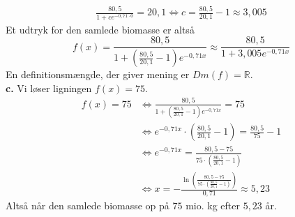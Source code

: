 \documentclass{article}
\begin{document}
\begin{equation*}
\begin{split}
  \frac{80,5}{1+c e^{-0,71 \cdot 0} }= 20,1 \iff c=\frac{80,5}{20,1}-1 \approx 3,005
\end{split}
\end{equation*}
Et udtryk for den samlede biomasse er altså
\[
f(x)= \frac{80,5}{1+\left(\frac{80,5}{20,1}-1\right) e^{-0,71x} } \approx \frac{80,5}{1+3,005 e^{-0,71x} }
\] 
En definitionsmængde, der giver mening er $Dm(f)=\mathbb{R}$. \\[1ex]
\noindent\textbf{c.}
Vi løser ligningen $f(x)= 75$.
\begin{equation*}
\begin{split}
  f(x)= 75 &\iff \frac{80,5}{1+\left(\frac{80,5}{20,1}-1\right) e^{-0,71x} }=75\\
  &\iff e^{-0,71x} \cdot \left(\frac{80,5}{20,1}-1\right)  =\frac{80,5}{75}-1\\
  &\iff e^{-0,71x} =\frac{80,5-75}{75 \cdot \left(\frac{80,5}{20,1}-1\right) }\\
  &\iff x=-\frac{\ln\left(\frac{80,5-75}{75 \cdot \left(\frac{80,5}{20,1}-1\right) }\right) }{0,71} \approx 5,23
\end{split}
\end{equation*}
Altså når den samlede biomasse op på $75$ mio. kg efter $5,23$ år. 
\end{document}
